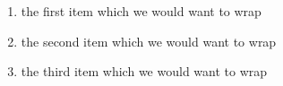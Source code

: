 
\begin{enumerate}
  \item the first item which
        we would want to wrap
  \item the second item which we would want to wrap
  \item the third item which we would want to wrap
\end{enumerate}

